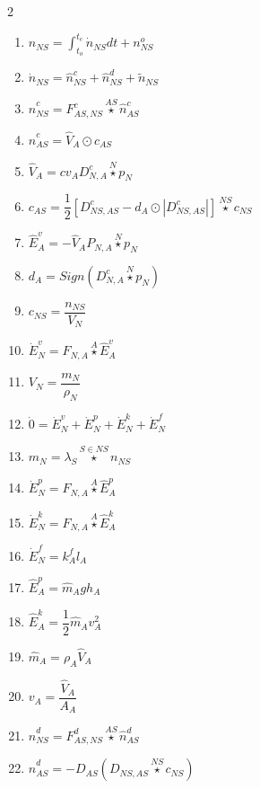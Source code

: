\documentclass[10pt,a4paper]{report}
\begin{document}
	\begin{multicols}{2}
	\begin{enumerate}
		\item $n_{NS} = \int_{t_o}^{t_e} \dot{n}_{NS} dt + n^{o}_{NS}$
		\item $\dot{n}_{NS} = \hat{n}^{c}_{NS} + \hat{n}^{d}_{NS} + \tilde{n}_{NS}$		
		\item $\hat{n}^{c}_{NS} = F^{c}_{AS,NS} \overset{AS}{\star} \hat{n}^{c}_{AS}$
		\item $\hat{n}^{c}_{AS} = \hat{V}_{A} \odot c_{AS}$
		\item $\hat{V}_{A} = cv_A D^{c}_{N,A} \overset{N}{\star} p_N$
		\item $c_{AS} = \dfrac{1}{2} \left[ D^{c}_{NS,AS} - d_A \odot \left|D^{c}_{NS,AS} \right|  \right] \overset{NS}{\star} c_{NS}$
		\item $\hat{E}^{v}_{A} = -\hat{V}_{A} P_{N,A} \overset{N}{\star} p_N$
		\item $d_A = Sign(D^{c}_{N,A} \overset{N}{\star} p_N)$
		\item $c_{NS} = \dfrac{n_{NS}}{V_N}$
		\item $\dot{E}^{v}_N = F_{N,A} \overset{A}{\star} \hat{E}^{v}_{A}$
		\item $V_N = \dfrac{m_N}{\rho_N}$
		\item $\dot{0} = \dot{E}^{v}_N + \dot{E}^{p}_N + \dot{E}^{k}_N + \dot{E}^{f}_N$
		\item $m_N = \lambda_S \overset{S \in NS}{\star} n_{NS}$
		\item $\dot{E}^{p}_N = F_{N,A} \overset{A}{\star} \hat{E}^{p}_{A}$
		\item $\dot{E}^{k}_N = F_{N,A} \overset{A}{\star} \hat{E}^{k}_{A}$
		\item $\dot{E}^{f}_N = k^{f}_A l_A$
		\item $\hat{E}^{p}_{A} = \hat{m}_A g h_A$
		\item $\hat{E}^{k}_{A} = \dfrac{1}{2} \hat{m}_A v_A^2$
		\item $\hat{m}_A = \rho_A \hat{V}_{A}$
		\item $v_A = \dfrac{\hat{V}_{A}}{A_A} $
		\item $\hat{n}^{d}_{NS} = F^{d}_{AS,NS} \overset{AS}{\star} \hat{n}^{d}_{AS}$
		\item $\hat{n}^{d}_{AS} = -D_{AS} \left( D_{NS,AS} \overset{NS}{\star} c_{NS} \right) $
	\end{enumerate}
\end{multicols}	
\end{document}
